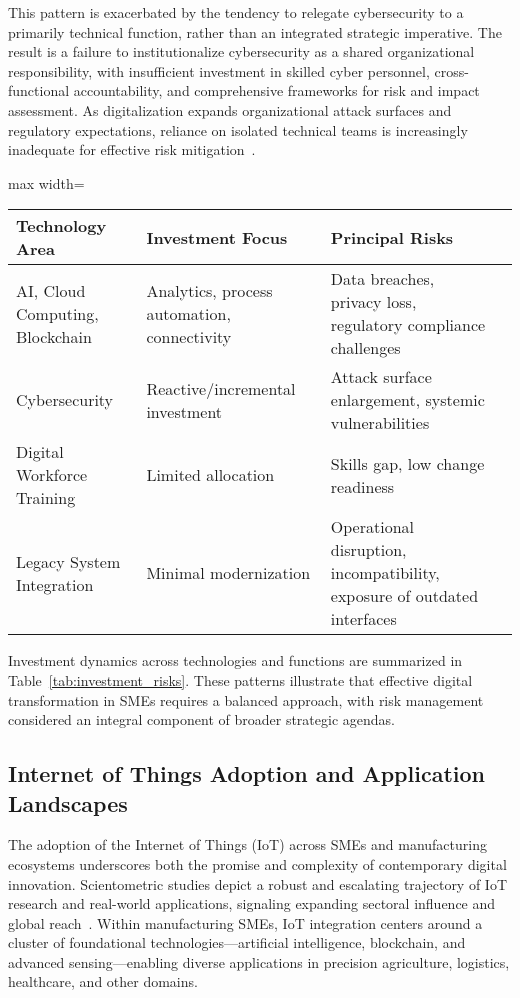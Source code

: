 \documentclass[sigconf]{acmart}
\begin{document}
This pattern is exacerbated by the tendency to relegate cybersecurity to a primarily technical function, rather than an integrated strategic imperative. The result is a failure to institutionalize cybersecurity as a shared organizational responsibility, with insufficient investment in skilled cyber personnel, cross-functional accountability, and comprehensive frameworks for risk and impact assessment. As digitalization expands organizational attack surfaces and regulatory expectations, reliance on isolated technical teams is increasingly inadequate for effective risk mitigation~\cite{ref35}.

\begin{table*}[htbp]
\centering
\caption{Key Investment Priorities and Associated Risks in SME Digital Transformation}
\label{tab:investment_risks}
\begin{adjustbox}{max width=\textwidth}
\begin{tabular}{llll}
\toprule
\textbf{Technology Area} & \textbf{Investment Focus} & \textbf{Principal Risks} \\
\midrule
AI, Cloud Computing, Blockchain & Analytics, process automation, connectivity & Data breaches, privacy loss, regulatory compliance challenges \\
Cybersecurity & Reactive/incremental investment & Attack surface enlargement, systemic vulnerabilities \\
Digital Workforce Training & Limited allocation & Skills gap, low change readiness \\
Legacy System Integration & Minimal modernization & Operational disruption, incompatibility, exposure of outdated interfaces \\
\bottomrule
\end{tabular}
\end{adjustbox}
\end{table*}

Investment dynamics across technologies and functions are summarized in Table~\ref{tab:investment_risks}. These patterns illustrate that effective digital transformation in SMEs requires a balanced approach, with risk management considered an integral component of broader strategic agendas.

\subsection{Internet of Things Adoption and Application Landscapes}

The adoption of the Internet of Things (IoT) across SMEs and manufacturing ecosystems underscores both the promise and complexity of contemporary digital innovation. Scientometric studies depict a robust and escalating trajectory of IoT research and real-world applications, signaling expanding sectoral influence and global reach~\cite{ref33}. Within manufacturing SMEs, IoT integration centers around a cluster of foundational technologies---artificial intelligence, blockchain, and advanced sensing---enabling diverse applications in precision agriculture, logistics, healthcare, and other domains.
\end{document}
